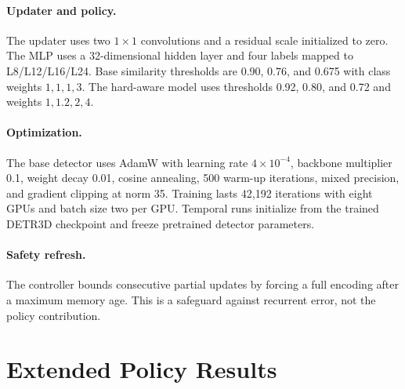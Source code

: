 \documentclass[10pt,twocolumn,letterpaper]{article}
\begin{document}
\paragraph{Updater and policy.}
The updater uses two $1\times1$ convolutions and a residual scale initialized to zero. The MLP uses a 32-dimensional hidden layer and four labels mapped to L8/L12/L16/L24. Base similarity thresholds are 0.90, 0.76, and 0.675 with class weights $1,1,1,3$. The hard-aware model uses thresholds 0.92, 0.80, and 0.72 and weights $1,1.2,2,4$.

\paragraph{Optimization.}
The base detector uses AdamW with learning rate $4\times10^{-4}$, backbone multiplier 0.1, weight decay 0.01, cosine annealing, 500 warm-up iterations, mixed precision, and gradient clipping at norm 35. Training lasts 42,192 iterations with eight GPUs and batch size two per GPU. Temporal runs initialize from the trained DETR3D checkpoint and freeze pretrained detector parameters.

\paragraph{Safety refresh.}
The controller bounds consecutive partial updates by forcing a full encoding after a maximum memory age. This is a safeguard against recurrent error, not the policy contribution.








\section{Extended Policy Results}
\label{app:policy-results}
\end{document}
